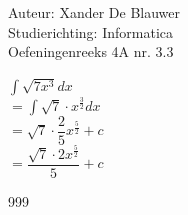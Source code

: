 \documentclass[a4paper]{article}
\begin{document}
\noindent \large Auteur: Xander De Blauwer \\
\noindent \large Studierichting: Informatica\\
\noindent \large Oefeningenreeks 4A nr. 3.3\\

\medskip

\normalsize

$ \displaystyle\int \sqrt{7x^3}dx $ \\

$ = \displaystyle\int \sqrt{7} \cdot x^{\tfrac{3}{2}}dx $ \\

$ = \sqrt{7} \cdot \dfrac{2}{5}x^{\tfrac{5}{2}} + c $ \\

$ = \dfrac{\sqrt{7} \cdot 2x^{\tfrac{5}{2}}}{5} + c$\\




\begin{thebibliography}{999}
\end{thebibliography}
\end{document}
